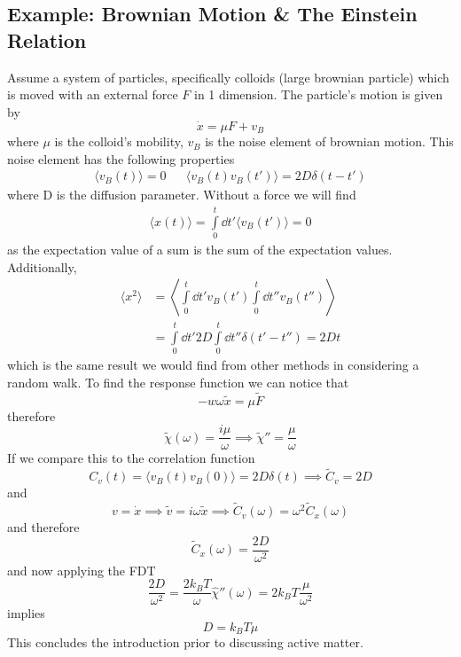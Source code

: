 \subsection{Example: Brownian Motion \& The Einstein Relation}
Assume a system of particles, specifically colloids (large brownian particle) which is moved with an external force \(F\) in 1 dimension. The particle's motion is given by
\begin{equation}
	\dot x = \mu F + v_B
\end{equation}
where \(\mu \) is the colloid's mobility, \(v_B\) is the noise element of brownian motion. This noise element has the following properties
\begin{align}
	\langle v_B(t)\rangle = 0 && \langle v_B(t)v_B(t')\rangle = 2D\delta(t-t')
\end{align}
where D is the diffusion parameter. Without a force we will find
\begin{align}
	\langle x(t) \rangle = \int\limits_0^t\dd t' \langle v_B(t')\rangle = 0
\end{align}
as the expectation value of a sum is the sum of the expectation values. Additionally,
\begin{align}
	\langle x^2 \rangle &= \left\langle \int\limits_0^t\dd t' v_B(t')\int\limits_0^t\dd t'' v_B(t'')\right\rangle \\
	&= \int\limits_0^t\dd t' 2D \int\limits_0^t\dd t'' \delta(t'-t'') = 2Dt
\end{align}
which is the same result we would find from other methods in considering a random walk. To find the response function we can notice that
\begin{equation}
	-w\omega \tilde x = \mu \tilde F
\end{equation}
therefore
\begin{equation}
	\tilde \chi(\omega) = \frac{i\mu}{\omega} \implies \tilde\chi'' = \frac{\mu}{\omega}
\end{equation}
If we compare this to the correlation function
\begin{equation}
	C_v(t) = \langle v_B(t)v_B(0)\rangle = 2D\delta(t) \implies \tilde C_v = 2D
\end{equation}
and
\begin{equation}
	v=\dot x \implies \tilde v = i\omega \tilde x \implies \tilde C_v(\omega) = \omega^2\tilde C_x(\omega)
\end{equation}
and therefore
\begin{equation}
	\boxed{\tilde C_x(\omega) = \frac{2D}{\omega^2}}
\end{equation}
and now applying the FDT
\begin{equation}
	\frac{2D}{\omega^2} = \frac{2k_B T}{\omega}\hat\chi''(\omega) = 2k_B T\frac{\mu}{\omega^2}
\end{equation}
implies
\begin{equation}
	\boxed{D = k_B T\mu}
\end{equation}
This concludes the introduction prior to discussing active matter.
\newpage
